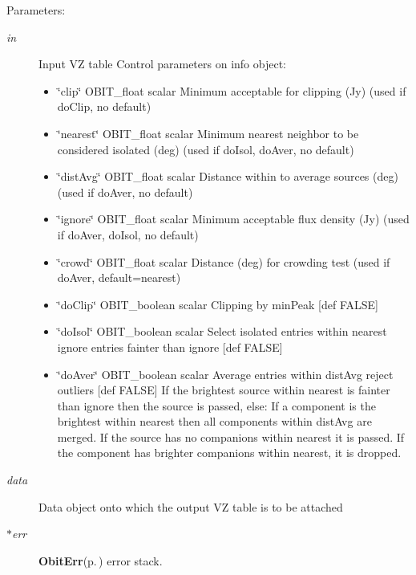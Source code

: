 \begin{Desc}
\item[Parameters:]
\begin{description}
\item[{\em in}]Input VZ table Control parameters on info object: \begin{itemize}
\item \char`\"{}clip\char`\"{} OBIT\_\-float scalar Minimum acceptable for clipping (Jy) (used if do\-Clip, no default) \item \char`\"{}nearest\char`\"{} OBIT\_\-float scalar Minimum nearest neighbor to be considered isolated (deg) (used if do\-Isol, do\-Aver, no default) \item \char`\"{}dist\-Avg\char`\"{} OBIT\_\-float scalar Distance within to average sources (deg) (used if do\-Aver, no default) \item \char`\"{}ignore\char`\"{} OBIT\_\-float scalar Minimum acceptable flux density (Jy) (used if do\-Aver, do\-Isol, no default) \item \char`\"{}crowd\char`\"{} OBIT\_\-float scalar Distance (deg) for crowding test (used if do\-Aver, default=nearest) \item \char`\"{}do\-Clip\char`\"{} OBIT\_\-boolean scalar Clipping by min\-Peak [def FALSE] \item \char`\"{}do\-Isol\char`\"{} OBIT\_\-boolean scalar Select isolated entries within nearest ignore entries fainter than ignore [def FALSE] \item \char`\"{}do\-Aver\char`\"{} OBIT\_\-boolean scalar Average entries within dist\-Avg reject outliers [def FALSE] If the brightest source within nearest is fainter than ignore then the source is passed, else: If a component is the brightest within nearest then all components within dist\-Avg are merged. If the source has no companions within nearest it is passed. If the component has brighter companions within nearest, it is dropped. \end{itemize}
\item[{\em data}]Data object onto which the output VZ table is to be attached \item[{\em $\ast$err}]{\bf Obit\-Err}{\rm (p.\,\pageref{structObitErr})} error stack. \end{description}
\end{Desc}
